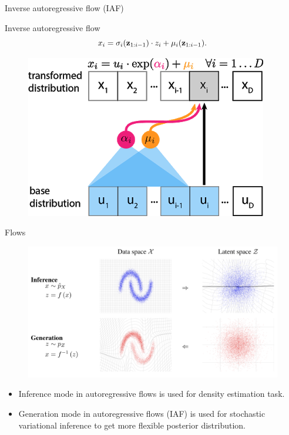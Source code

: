 \begin{frame}{Inverse autoregressive flow (IAF)}
	\begin{minipage}[t]{0.65\columnwidth}
		\begin{block}{Inverse autoregressive flow}
			\[
			x_i = \sigma_i (\mathbf{z}_{1:i-1}) \cdot z_i + \mu_i(\mathbf{z}_{1:i-1}).
			\]
		\end{block}
	\end{minipage}%
	\begin{minipage}[t]{0.35\columnwidth}
		\begin{figure}[h]
			\centering
			\includegraphics[width=.9\linewidth]{figs/maf_iaf_explained_3.png}
		\end{figure}
	\end{minipage}
	
\end{frame}
\begin{frame}{Flows}
	\begin{figure}
		\includegraphics[width=0.8\linewidth]{figs/flows_how2.png}
	\end{figure}
	\begin{itemize}	
		\item Inference mode in autoregressive flows is used for density estimation task.
		\item Generation mode in autoregressive flows (IAF) is used for stochastic variational inference to get more flexible posterior distribution.
	\end{itemize}
	
\end{frame}
